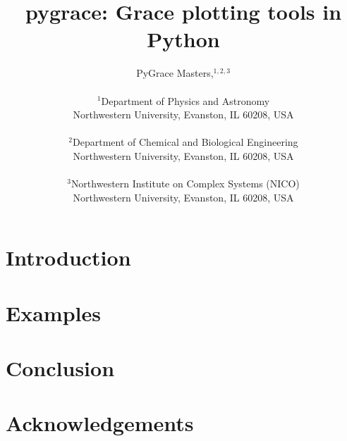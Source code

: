 \documentclass[11pt]{article}
\title{pygrace: Grace plotting tools in Python}
\author
{PyGrace Masters,$^{1,2,3}$
\\ \\
$^{1}$Department of Physics and Astronomy \\
Northwestern University, Evanston, IL 60208, USA \\ \\
$^{2}$Department of Chemical and Biological Engineering \\
Northwestern University, Evanston, IL 60208, USA \\ \\
$^{3}$Northwestern Institute on Complex Systems (NICO) \\
Northwestern University, Evanston, IL 60208, USA
}
\date{}
\begin{document}

\baselineskip18pt   %

\maketitle

\section*{Introduction}


\section*{Examples}


\section*{Conclusion}


\section*{Acknowledgements}




\end{document}

